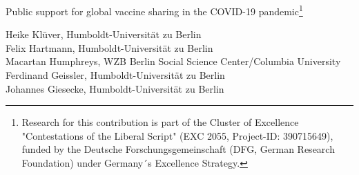 \documentclass[12pt,oneside,smallheadings,chapterprefix=true]{article}
\begin{document}

\setlength{\textwidth}{14.0cm}

\onehalfspacing

\vspace*{0.7cm}
\begin{center}
\begin{huge}
Public support for global vaccine sharing in the COVID-19 pandemic\footnote{Research for this contribution is part of the Cluster of Excellence "Contestations of the Liberal Script" (EXC 2055, Project-ID: 390715649), funded by the Deutsche Forschungsgemeinschaft (DFG, German Research Foundation) under Germany´s Excellence Strategy.}
\end{huge}
\end{center}

\vspace*{0.5cm}

\begin{center}
Heike Klüver, Humboldt-Universität zu Berlin \\
Felix Hartmann, Humboldt-Universität zu Berlin \\ 
Macartan Humphreys, WZB Berlin Social Science Center/Columbia University \\
Ferdinand Geissler, Humboldt-Universität zu Berlin \\
Johannes Giesecke, Humboldt-Universität zu Berlin



\end{center}		
		
\vspace*{1cm}
										
								
\end{document}

